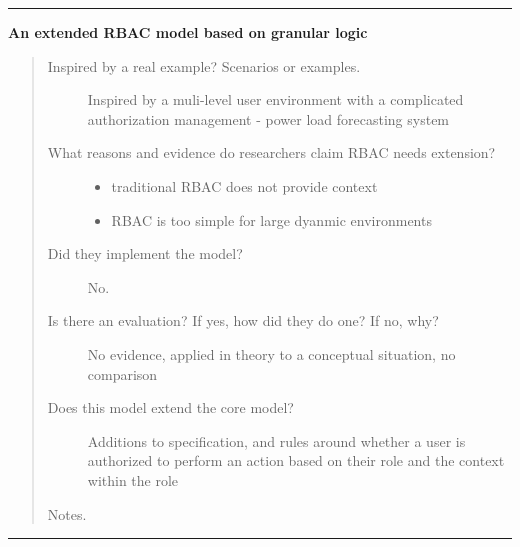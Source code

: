 \documentclass[letterpaper,10pt,english]{sphinxmanual}
\begin{document}
\bigskip\hrule{}\bigskip


\textbf{An extended RBAC model based on granular logic}
\begin{quote}
\begin{description}
\item[{Inspired by a real example? Scenarios or examples.}] \leavevmode
Inspired by a muli-level user environment with a complicated authorization management - power load forecasting system

\item[{What reasons and evidence do researchers claim RBAC needs extension?}] \leavevmode\begin{itemize}
\item {} 
traditional RBAC does not provide context

\item {} 
RBAC is too simple for large dyanmic environments

\end{itemize}

\item[{Did they implement the model?}] \leavevmode
No.

\item[{Is there an evaluation? If yes, how did they do one? If no, why?}] \leavevmode
No evidence, applied in theory to a conceptual situation, no comparison

\item[{Does this model extend the core model?}] \leavevmode
Additions to specification, and rules around whether a user is authorized to perform an action based on their role and the context within the role

\end{description}

Notes.
\end{quote}


\bigskip\hrule{}\bigskip
\end{document}

